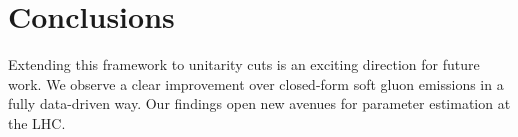 \section{Conclusions}\label{sec:conclusions}

Extending this framework to unitarity cuts is an exciting direction for
future work. We observe a clear improvement over closed-form soft gluon
emissions in a fully data-driven way. Our findings open new avenues for
parameter estimation at the LHC.

